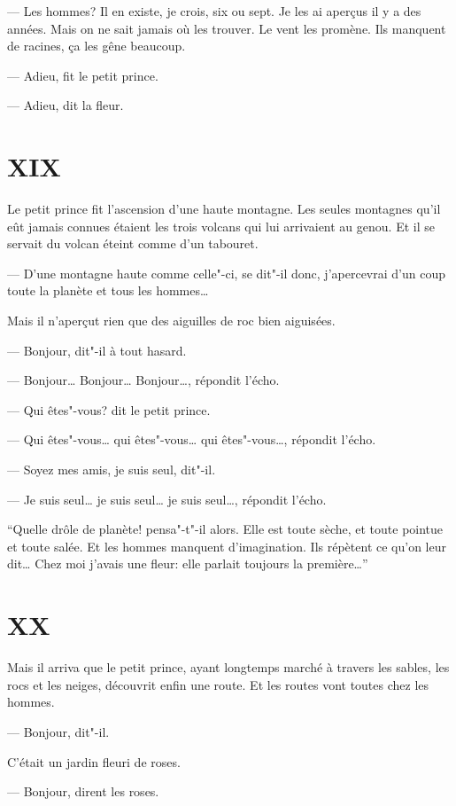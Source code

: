 \begin{Parallel}[p]{}{}
{--- Les hommes? Il en existe, je crois, six ou sept. Je
les ai aperçus il y a des années. Mais on ne sait
jamais où les trouver. Le vent les promène. Ils manquent de racines, ça les gêne beaucoup.

--- Adieu, fit le petit prince.

--- Adieu, dit la fleur.

\section{XIX}

Le petit prince fit l'ascension d'une haute montagne. Les seules montagnes qu'il eût jamais
connues étaient les trois volcans qui lui arrivaient au
genou. Et il se servait du volcan éteint comme d'un
tabouret.

--- D'une montagne haute comme celle"-ci, se dit"-il donc, j'apercevrai d'un coup toute la planète et tous les hommes\ldots{}

Mais il n'aperçut rien que des aiguilles de roc bien aiguisées.

--- Bonjour, dit"-il à tout hasard.

--- Bonjour\ldots{} Bonjour\ldots{} Bonjour\ldots{}, répondit l'écho.

--- Qui êtes"-vous? dit le petit prince.

--- Qui êtes"-vous\ldots{} qui êtes"-vous\ldots{} qui êtes"-vous\ldots{},
répondit l'écho.

--- Soyez mes amis, je suis seul, dit"-il.

--- Je suis seul\ldots{} je suis seul\ldots{} je suis seul\ldots{}, répondit l'écho.

``Quelle drôle de planète! pensa"-t"-il alors. Elle est
toute sèche, et toute pointue et toute salée. Et les
hommes manquent d'imagination. Ils répètent ce
qu'on leur dit\ldots{} Chez moi j'avais une fleur: elle
parlait toujours la première\ldots{}''

\section{XX}

Mais il arriva que le petit prince, ayant longtemps
marché à travers les sables, les rocs et les neiges,
découvrit enfin une route. Et les routes vont toutes
chez les hommes.

--- Bonjour, dit"-il.

C'était un jardin fleuri de roses.

--- Bonjour, dirent les roses.

}
\end{Parallel}
